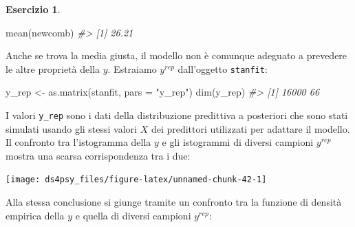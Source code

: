 \documentclass[
  11pt,
]{krantz}
\makeatletter
\newenvironment{Shaded}{\begin{snugshade}}{\end{snugshade}}
\newcommand{\AttributeTok}[1]{\textcolor[rgb]{0.61,0.61,0.61}{#1}}
\newcommand{\CommentTok}[1]{\textcolor[rgb]{0.37,0.37,0.37}{\textit{#1}}}
\newcommand{\DecValTok}[1]{\textcolor[rgb]{0.06,0.06,0.06}{#1}}
\newcommand{\FunctionTok}[1]{\textcolor[rgb]{0,0,0}{#1}}
\newcommand{\NormalTok}[1]{#1}
\newcommand{\OtherTok}[1]{\textcolor[rgb]{0.37,0.37,0.37}{#1}}
\newcommand{\SpecialCharTok}[1]{\textcolor[rgb]{0,0,0}{#1}}
\newcommand{\StringTok}[1]{\textcolor[rgb]{0.5,0.5,0.5}{#1}}
\newenvironment{kframe}{%
\medskip{}
\setlength{\fboxsep}{.8em}
 \def\at@end@of@kframe{}%
 \ifinner\ifhmode%
  \def\at@end@of@kframe{\end{minipage}}%
  \begin{minipage}{\columnwidth}%
 \fi\fi%
 \def\FrameCommand##1{\hskip\@totalleftmargin \hskip-\fboxsep
 \colorbox{shadecolor}{##1}\hskip-\fboxsep
     \hskip-\linewidth \hskip-\@totalleftmargin \hskip\columnwidth}%
 \MakeFramed {\advance\hsize-\width
   \@totalleftmargin\z@ \linewidth\hsize
   \@setminipage}}%
 {\par\unskip\endMakeFramed%
 \at@end@of@kframe}
\renewenvironment{Shaded}{\begin{kframe}}{\end{kframe}}
\theoremstyle{definition}
\theoremstyle{definition}
\theoremstyle{definition}
\newtheorem{exercise}{Esercizio}[chapter]
\theoremstyle{definition}
\theoremstyle{remark}
\makeatother
\begin{document}
\begin{exercise}
\begin{Shaded}
\begin{Highlighting}[]
\FunctionTok{mean}\NormalTok{(newcomb)}
\CommentTok{\#\textgreater{} [1] 26.21}
\end{Highlighting}
\end{Shaded}

Anche se trova la media giusta, il modello non è comunque adeguato a prevedere le altre proprietà della \(y\). Estraiamo \(y^{rep}\) dall'oggetto \texttt{stanfit}:

\begin{Shaded}
\begin{Highlighting}[]
\NormalTok{y\_rep }\OtherTok{\textless{}{-}} \FunctionTok{as.matrix}\NormalTok{(stanfit, }\AttributeTok{pars =} \StringTok{"y\_rep"}\NormalTok{)}
\FunctionTok{dim}\NormalTok{(y\_rep)}
\CommentTok{\#\textgreater{} [1] 16000    66}
\end{Highlighting}
\end{Shaded}

I valori \texttt{y\_rep} sono i dati della distribuzione predittiva a posteriori che sono stati simulati usando gli stessi valori \(X\) dei predittori utilizzati per adattare il modello. Il confronto tra l'istogramma della \(y\) e gli istogrammi di diversi campioni \(y^{rep}\) mostra una scarsa corrispondenza tra i due:

\begin{Shaded}
\end{Shaded}

\begin{center}\texttt{[image: ds4psy\_files/figure-latex/unnamed-chunk-42-1]} \end{center}

Alla stessa conclusione si giunge tramite un confronto tra la funzione di densità empirica della \(y\) e quella di diversi campioni \(y^{rep}\):

\begin{Shaded}
\end{Shaded}


\end{exercise}
\end{document}
